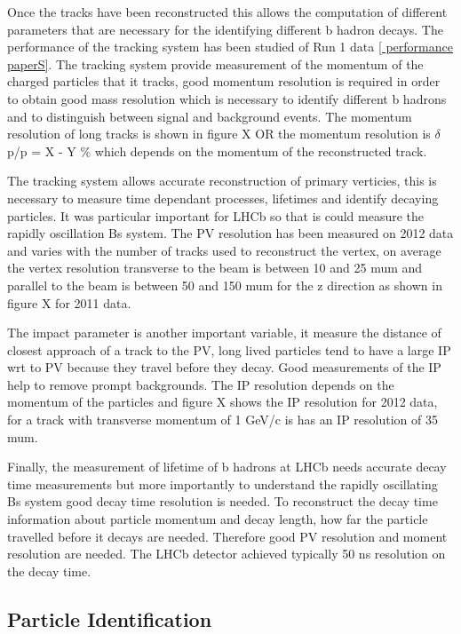 Once the tracks have been reconstructed this allows the computation of different parameters that are necessary for the identifying different b hadron decays. The performance of the tracking system has been studied of Run 1 data \ref{ performance paperS}. The tracking system provide measurement of the momentum of the charged particles that it tracks, good momentum resolution is required in order to obtain good mass resolution which is necessary to identify different  b hadrons and to distinguish between signal and background events. The momentum resolution of long tracks is shown in figure X OR the momentum resolution is $\delta$p/p = X - Y $\%$ which depends on the momentum of the reconstructed track. 


The tracking system allows accurate reconstruction of primary verticies, this is necessary to measure time dependant processes, lifetimes and identify decaying particles. It was particular important for LHCb so that is could measure the rapidly oscillation Bs system. The PV resolution has been measured on 2012 data and varies with the number of tracks used to reconstruct the vertex, on average the vertex resolution transverse to the beam is between 10 and 25 mum and parallel to the beam is  between 50 and 150 mum for the z direction as shown in figure X for 2011 data. %



The impact parameter is another important variable, it measure the distance of closest approach of a track to the PV, long lived particles tend to have a large IP wrt to PV because they travel before they decay. Good measurements of the IP help to remove prompt backgrounds. The IP resolution depends on the momentum of the particles and figure X shows the IP resolution for 2012 data, for a track with transverse momentum of 1 GeV/c is has an IP resolution of 35 mum.


Finally, the measurement of lifetime of b hadrons at LHCb needs accurate decay time measurements but more importantly to understand the rapidly oscillating Bs system good decay time resolution is needed. To reconstruct the decay time information about particle momentum and decay length, how far the particle travelled before it decays are needed. Therefore good PV resolution and moment resolution are needed. The LHCb detector achieved typically 50 ns resolution on the decay time. 





\subsection{Particle Identification}
